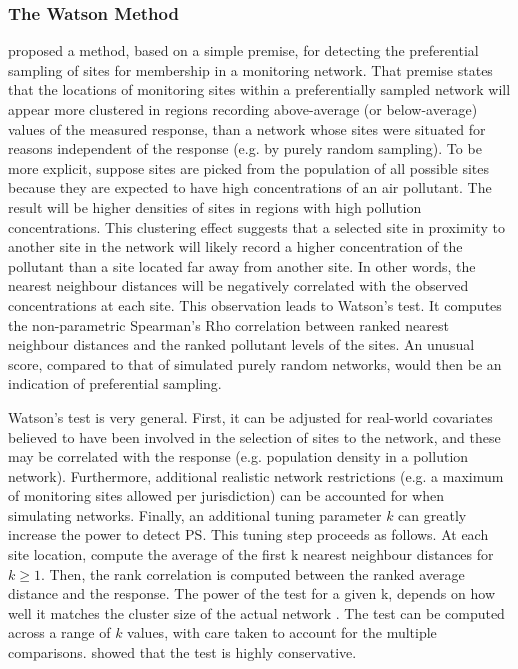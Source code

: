 \subsubsection*{The Watson Method} \label{subsubsec:WatsonPrefSample}
\cite{watson2020} proposed a method, based on a simple premise, for detecting the preferential sampling of sites for membership in a monitoring network. That premise states that the locations of monitoring sites within a preferentially sampled network will appear more clustered in regions recording above-average (or below-average) values of the measured response, than a network whose sites were situated for reasons independent of the response (e.g. by purely random sampling).
To be more explicit, suppose sites are picked from the population of all possible sites because they are expected to have high concentrations of an air pollutant. The result will be higher densities of sites in regions with high pollution concentrations.  This clustering effect suggests that a selected site in proximity to another site in the network will likely record a higher concentration of the pollutant than a site located far away from another site.
In other words, the nearest neighbour distances will be negatively correlated with the observed concentrations at each site. 
This observation leads to Watson's test. It computes the non-parametric Spearman's Rho correlation between ranked nearest neighbour distances and the ranked pollutant levels of the sites. An unusual score, compared to that of simulated purely random networks, would then be an indication of preferential sampling.

Watson's test \cite{watson2019} is very general. First, it can be adjusted for real-world covariates believed to have been involved in the selection of sites to the network, and these may be correlated with the response (e.g. population density in a pollution network). Furthermore, additional realistic network restrictions (e.g. a maximum of monitoring sites allowed per jurisdiction) can be accounted for when simulating networks. Finally, an additional tuning parameter $k$ can greatly increase the power to detect PS. This tuning step proceeds as follows. At each site location, compute the average of the first \gls{k} nearest neighbour distances for $ k \geq 1$. Then, the rank correlation is computed between the ranked average distance and the response. The power of the test for a given \gls{k}, depends on how well it matches the cluster size of the actual network \citep{watson2020}. The test can be computed across a range of $k$ values, with care taken to account for the multiple comparisons. \citet{watson2020} showed that the test is highly conservative.   

